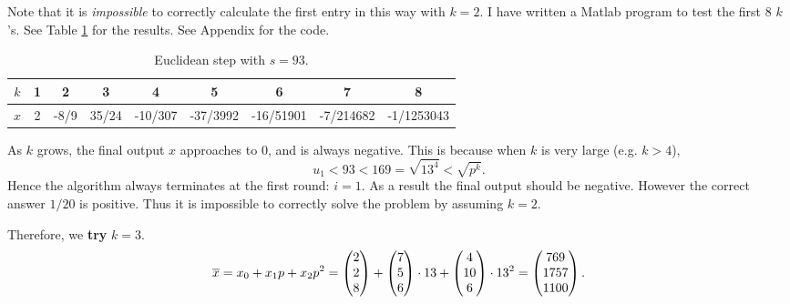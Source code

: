 \documentclass[12pt]{article}
\theoremstyle{plain}
\begin{document}
Note that it is \emph{impossible} to correctly calculate the first entry in this way with $k=2$. I have written a Matlab program to test the first 8 $k$'s. See Table \ref{tab:1} for the results. See Appendix for the code.
\begin{table}
\centering
\caption{Euclidean step with $s=93$.}
\begin{tabular}{c || c| c| c| c| c| c |c |c}
\hline
$k$ & 1 & 2 & 3 & 4 & 5 & 6 & 7 & 8\\
\hline
$x$ & 2 & -8/9 & 35/24 & -10/307 & -37/3992 & -16/51901 & -7/214682 & -1/1253043 \\
\hline
\end{tabular}
\label{tab:1}
\end{table}
As $k$ grows, the final output $x$ approaches to 0, and is always negative. This is because when $k$ is very large (e.g. $k>4$), 
$$u_1 < 93 < 169 = \sqrt{13^4} < \sqrt{p^k}.$$
Hence the algorithm always terminates at the first round: $i=1$. As a result the final output should be negative. However the correct answer $1/20$ is positive. Thus it is impossible to correctly solve the problem by assuming $k=2$.

Therefore, we {\bf try} $k=3$.
$$\overline{x} = x_0 + x_1p+x_2p^2 = \begin{pmatrix}2\\2\\8\end{pmatrix} + \begin{pmatrix}7\\5\\6\end{pmatrix} \cdot 13 + \begin{pmatrix}4\\10\\6\end{pmatrix} \cdot 13^2 = \begin{pmatrix}769\\1757\\1100\end{pmatrix}.$$
\end{document}
